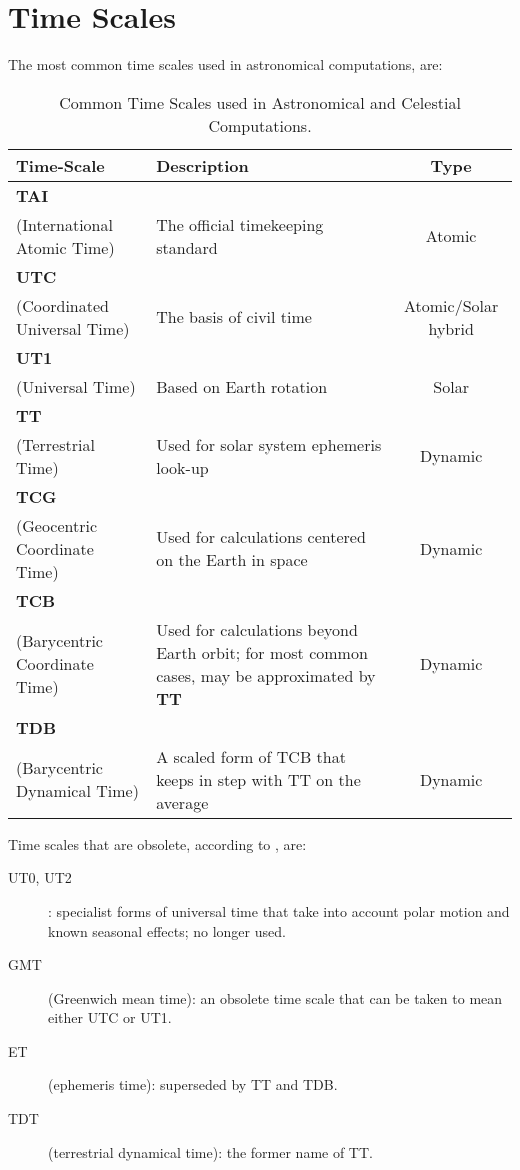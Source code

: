 \section{Time Scales}
The most common time scales used in astronomical computations, are:
\begin{table}
  \centering
\begin{tabularx}{\textwidth}{>{\raggedright\arraybackslash}X >{\raggedright\arraybackslash}X c}
    \bf{Time-Scale} & \bf{Description} & \bf{Type} \\
  \hline
  \textbf{TAI}\\ \scriptsize{(International Atomic Time)} & The official timekeeping standard & Atomic \\
  \textbf{UTC}\\ \scriptsize{(Coordinated Universal Time)} & The basis of civil time & Atomic/Solar hybrid \\
  \textbf{UT1}\\ \scriptsize{(Universal Time)} & Based on Earth rotation & Solar \\
  \textbf{TT}\\ \scriptsize{(Terrestrial Time)} & Used for solar system ephemeris look-up &  Dynamic \\
  \textbf{TCG}\\ \scriptsize{(Geocentric Coordinate Time)} & Used for calculations centered on the Earth in space & Dynamic \\
  \textbf{TCB}\\ \scriptsize{(Barycentric Coordinate Time)} & Used for calculations beyond Earth orbit; for most common cases, may be approximated by \textbf{TT} & Dynamic \\
  \textbf{TDB}\\ \scriptsize{(Barycentric Dynamical Time)} & A scaled form of TCB that keeps in step with TT
on the average & Dynamic \\
\end{tabularx}
\caption{Common Time Scales used in Astronomical and Celestial Computations.}
\end{table}

Time scales that are obsolete, according to \cite{sofa_18161_tscb}, are:
\begin{description}
  \item[UT0, UT2]: specialist forms of universal time that take into account polar motion and
known seasonal effects; no longer used.
  \item[GMT] (Greenwich mean time): an obsolete time scale that can be taken to mean either
UTC or UT1.
  \item[ET] (ephemeris time): superseded by TT and TDB.
  \item[TDT] (terrestrial dynamical time): the former name of TT.
\end{description}

